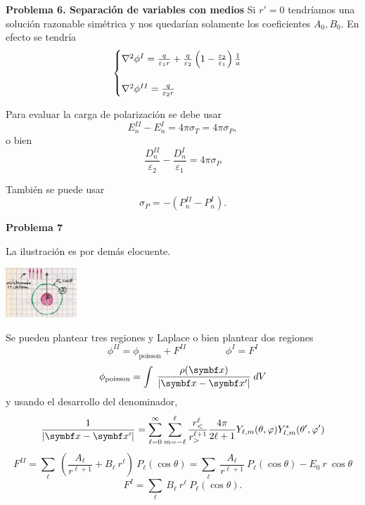 \documentclass[10pt,oneside]{CBFT_book}
\begin{document}
\begin{ejemplo}{\bf Problema 6. Separación de variables con medios}
Si $r'=0$ tendríamos una solución razonable simétrica y nos quedarían solamente
los coeficientes $A_0, B_0$. En efecto se tendría
\[
	\begin{cases}
	\nabla^2{\phi}^I = \frac{q}{\varepsilon_1 r} + 
	\frac{q}{\varepsilon_2}\left( 1 - \frac{\varepsilon_2}{\varepsilon_1} \right) \frac{1}{a} \\
	\\
	\nabla^2{\phi}^{II} =  \frac{q}{\varepsilon_2 r}
	\end{cases}
\]

Para evaluar la carga de polarización se debe usar
\[
	E_n^{II} - E_n^{I} = 4 \pi \sigma_T = 4 \pi \sigma_P,
\]
o bien
\[
	\frac{D_n^{II}}{\varepsilon_2} - \frac{D_n^{I}}{\varepsilon_1} = 
	4 \pi \sigma_P
\]

También se puede usar
\[
	\sigma_P = - ( P_n^{II} - P_n^{I} ).
\]

\end{ejemplo}

\begin{ejemplo}{\bf Problema 7 }

La ilustración es por demás elocuente.

\includegraphics[width=0.2\textwidth]{images/fig_ft1_problema7_medios.jpg} 

Se pueden plantear tres regiones y Laplace o bien plantear dos regiones
\[
	\phi^{II} = \phi_{\text{poisson}} + F^{II} \qquad \qquad 
	\phi^{I} = F^{I}
\]
\[
	\phi_{\text{poisson}} = \int \: \frac{\rho(\vbx)}{|\vbx - \vbx'|} \: dV
\]
y usando el desarrollo del denominador,
\[
	\frac{1}{|\vb{x}-\vb{x}'|}  = \sum_{\ell=0}^\infty \sum_{m=-\ell}^\ell 
	\frac{r_<^\ell}{r_>^{\ell+1}}
	\frac{4\pi}{2\ell+1} Y_{\ell,m}(\theta,\varphi) Y_{\ell,m}^*(\theta',\varphi')
\]
\[
	F^{II} = \sum_\ell \: \left( \frac{A_\ell}{r^{\ell+1}} +
	B_\ell \: r^\ell \right) \: P_\ell(\cos\theta) =
	\sum_\ell \: \frac{A_\ell}{r^{\ell+1}} \: P_\ell(\cos\theta) -
	E_0 \: r \: \cos\theta
\]
\[
	F^{I} = \sum_\ell \: B_\ell \: r^\ell \: P_\ell(\cos\theta).
\]
 
\end{ejemplo}
\end{document}
